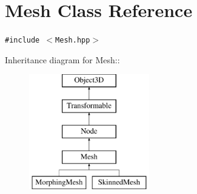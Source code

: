\hypertarget{classm3g_1_1Mesh}{
\section{Mesh Class Reference}
\label{classm3g_1_1Mesh}
}
{\tt \#include $<$Mesh.hpp$>$}

Inheritance diagram for Mesh::\begin{figure}[H]
\begin{center}
\leavevmode
\includegraphics[height=5cm]{classm3g_1_1Mesh}
\end{center}
\end{figure}
